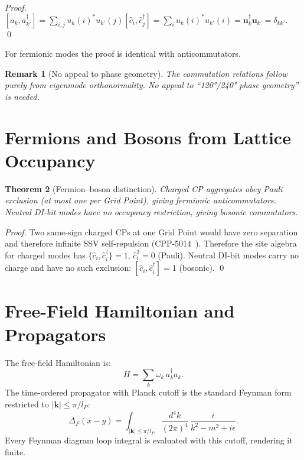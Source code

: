 \documentclass[11pt,letterpaper]{article}
\newtheorem{theorem}{Theorem}[section]
\newtheorem{remark}[theorem]{Remark}
\newcommand{\lP}{l_P}
\begin{document}
\begin{proof}
$[a_k,a_{k'}^\dagger] = \sum_{i,j} u_k(i)^* u_{k'}(j)
[\hat{c}_i,\hat{c}_j^\dagger] = \sum_i u_k(i)^* u_{k'}(i)
= \mathbf{u}_k^\dagger\mathbf{u}_{k'} = \delta_{kk'}$.
\qed
\end{proof}

For fermionic modes the proof is identical with anticommutators.

\begin{remark}[No appeal to phase geometry]
The commutation relations follow purely from eigenmode orthonormality.
No appeal to ``120°/240° phase geometry'' is needed.
\end{remark}

\section{Fermions and Bosons from Lattice Occupancy}

\begin{theorem}[Fermion--boson distinction]
\label{thm:fermboson}
Charged CP aggregates obey Pauli exclusion (at most one per Grid
Point), giving fermionic anticommutators.  Neutral DI-bit modes have
no occupancy restriction, giving bosonic commutators.
\end{theorem}

\begin{proof}
Two same-sign charged CPs at one Grid Point would have zero separation
and therefore infinite SSV self-repulsion (CPP-5014~\cite{cpp5014}).
Therefore the site algebra for charged modes has
$\{\hat{c}_i,\hat{c}_i^\dagger\} = 1$, $\hat{c}_i^2 = 0$ (Pauli).
Neutral DI-bit modes carry no charge and have no such exclusion:
$[\hat{c}_i,\hat{c}_i^\dagger] = 1$ (bosonic). \qed
\end{proof}

\section{Free-Field Hamiltonian and Propagators}

The free-field Hamiltonian is:
\begin{equation}
H = \sum_k \omega_k\,a_k^\dagger a_k.
\label{eq:Hfree}
\end{equation}
The time-ordered propagator with Planck cutoff is the standard Feynman
form restricted to $|\mathbf{k}|\le\pi/\lP$:
\begin{equation}
\Delta_F(x-y) = \int_{|\mathbf{k}|\le\pi/\lP}
\frac{d^4k}{(2\pi)^4}\,\frac{i}{k^2-m^2+i\epsilon}.
\label{eq:propagator}
\end{equation}
Every Feynman diagram loop integral is evaluated with this cutoff,
rendering it finite.
\end{document}
